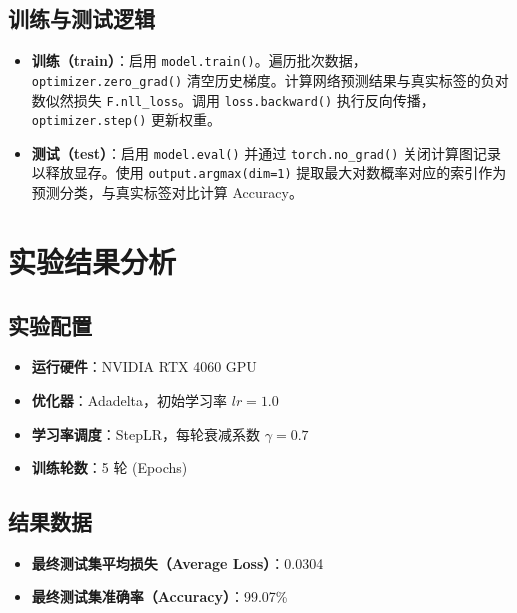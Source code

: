 \subsection{训练与测试逻辑}
\begin{itemize}
    \item \textbf{训练（train）}：启用 \texttt{model.train()}。遍历批次数据，\texttt{optimizer.zero\_grad()} 清空历史梯度。计算网络预测结果与真实标签的负对数似然损失 \texttt{F.nll\_loss}。调用 \texttt{loss.backward()} 执行反向传播，\texttt{optimizer.step()} 更新权重。
    \item \textbf{测试（test）}：启用 \texttt{model.eval()} 并通过 \texttt{torch.no\_grad()} 关闭计算图记录以释放显存。使用 \texttt{output.argmax(dim=1)} 提取最大对数概率对应的索引作为预测分类，与真实标签对比计算 Accuracy。
\end{itemize}

\section{实验结果分析}

\subsection{实验配置}
\begin{itemize}
    \item \textbf{运行硬件}：NVIDIA RTX 4060 GPU
    \item \textbf{优化器}：Adadelta，初始学习率 $lr = 1.0$
    \item \textbf{学习率调度}：StepLR，每轮衰减系数 $\gamma = 0.7$
    \item \textbf{训练轮数}：5 轮 (Epochs)
\end{itemize}

\subsection{结果数据}
\begin{itemize}
    \item \textbf{最终测试集平均损失（Average Loss）}：0.0304
    \item \textbf{最终测试集准确率（Accuracy）}：99.07\%
\end{itemize}

